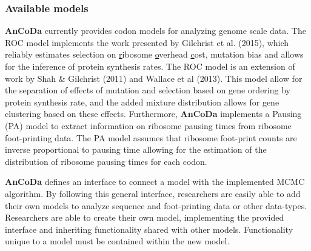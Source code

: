 \documentclass{bioinfo}
\newcommand{\package}{\textbf{AnCoDa }} %
\begin{document}
\subsubsection*{Available models}
\package currently provides codon models for analyzing genome scale data.
The ROC model implements the work presented by Gilchrist et al. (2015), which reliably estimates selection on \underline{r}ibosome \underline{o}verhead \underline{c}ost, mutation bias and allows for the inference of protein synthesis rates. The ROC model is an extension of work by Shah \& Gilchrist (2011) and  Wallace et al (2013). 
This model allow for the separation of effects of mutation and selection based on gene ordering by protein synthesis rate, and the added mixture distribution allows for gene clustering based on these effects.
Furthermore, \package implements a Pausing (PA) model to extract information on ribosome pausing times from ribosome foot-printing data. The PA model assumes that ribosome foot-print counts are inverse proportional to pausing time allowing for the estimation of the distribution of ribosome pausing times for each codon. 


\package defines an interface to connect a model with the implemented MCMC algorithm. 
By following this general interface, researchers are easily able to add their own models to analyze sequence and foot-printing data or other data-types.
Researchers are able to create their own model, implementing the provided interface and inheriting functionality shared with other models.
Functionality unique to a model must be contained within the new model. 
\end{document}
